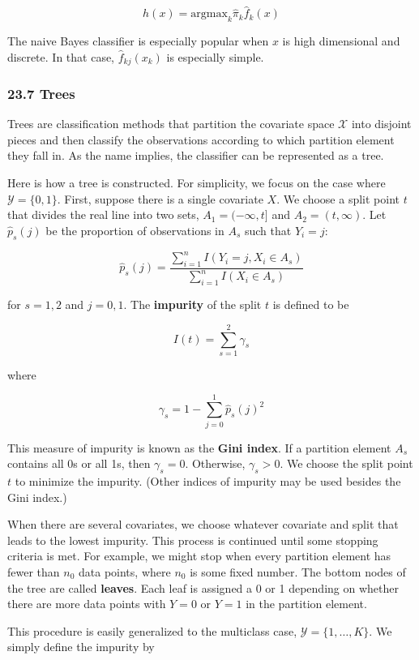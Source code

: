 \[ h(x) = \text{argmax}_k \hat{\pi}_k \hat{f}_k(x) \]

The naive Bayes classifier is especially popular when \(x\) is high
dimensional and discrete. In that case, \(\hat{f}_{kj}(x_k)\) is
especially simple.

\subsubsection{23.7 Trees}\label{trees}

Trees are classification methods that partition the covariate space
\(\mathcal{X}\) into disjoint pieces and then classify the observations
according to which partition element they fall in. As the name implies,
the classifier can be represented as a tree.

Here is how a tree is constructed. For simplicity, we focus on the case
where \(\mathcal{Y} = \{ 0, 1 \}\). First, suppose there is a single
covariate \(X\). We choose a split point \(t\) that divides the real
line into two sets, \(A_1 = (-\infty, t]\) and \(A_2 = (t, \infty)\).
Let \(\hat{p}_s(j)\) be the proportion of observations in \(A_s\) such
that \(Y_i = j\):

\[ \hat{p}_s(j) = \frac{\sum_{i=1}^n I(Y_i = j, X_i \in A_s)}{\sum_{i=1}^n I(X_i \in A_s)} \]

for \(s = 1, 2\) and \(j = 0, 1\). The \textbf{impurity} of the split
\(t\) is defined to be

\[ I(t) = \sum_{s=1}^2 \gamma_s \]

where

\[ \gamma_s = 1 - \sum_{j=0}^1 \hat{p}_s(j)^2 \]

This measure of impurity is known as the \textbf{Gini index}. If a
partition element \(A_s\) contains all 0s or all 1s, then
\(\gamma_s = 0\). Otherwise, \(\gamma_s > 0\). We choose the split point
\(t\) to minimize the impurity. (Other indices of impurity may be used
besides the Gini index.)

When there are several covariates, we choose whatever covariate and
split that leads to the lowest impurity. This process is continued until
some stopping criteria is met. For example, we might stop when every
partition element has fewer than \(n_0\) data points, where \(n_0\) is
some fixed number. The bottom nodes of the tree are called
\textbf{leaves}. Each leaf is assigned a 0 or 1 depending on whether
there are more data points with \(Y = 0\) or \(Y = 1\) in the partition
element.

This procedure is easily generalized to the multiclass case,
\(\mathcal{Y} = \{ 1, \dots, K \}\). We simply define the impurity by

